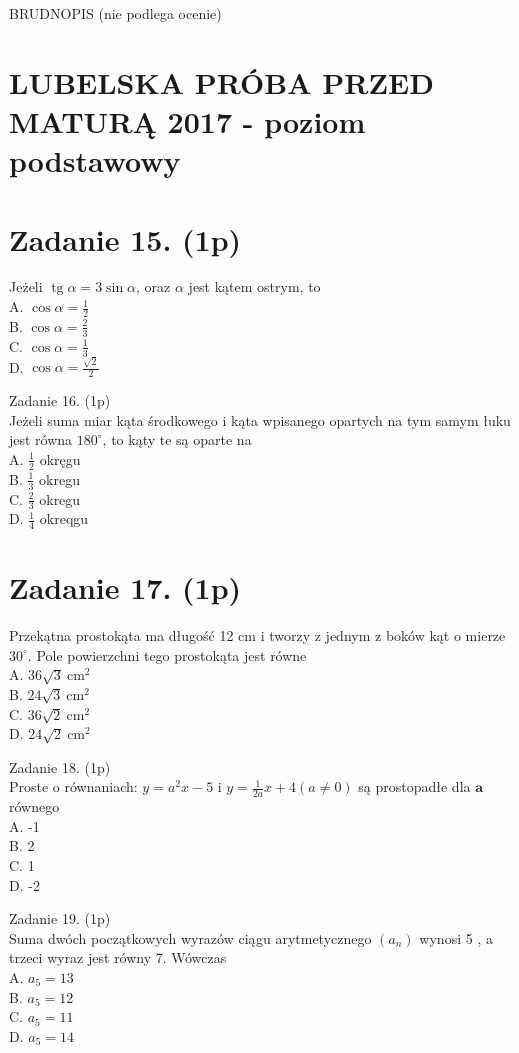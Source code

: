 \documentclass[10pt]{article}
\begin{document}
BRUDNOPIS (nie podlega ocenie)

\section*{LUBELSKA PRÓBA PRZED MATURĄ 2017 - poziom podstawowy}
\section*{Zadanie 15. (1p)}
Jeżeli \(\operatorname{tg} \alpha=3 \sin \alpha\), oraz \(\alpha\) jest kątem ostrym, to\\
A. \(\cos \alpha=\frac{1}{2}\)\\
B. \(\cos \alpha=\frac{2}{3}\)\\
C. \(\cos \alpha=\frac{1}{3}\)\\
D. \(\cos \alpha=\frac{\sqrt{2}}{2}\)

Zadanie 16. (1p)\\
Jeżeli suma miar kąta środkowego i kąta wpisanego opartych na tym samym łuku jest równa \(180^{\circ}\), to kąty te są oparte na\\
A. \(\frac{1}{2}\) okręgu\\
B. \(\frac{1}{3}\) okregu\\
C. \(\frac{2}{3}\) okregu\\
D. \(\frac{1}{4}\) okreqgu

\section*{Zadanie 17. (1p)}
Przekątna prostokąta ma długość 12 cm i tworzy z jednym z boków kąt o mierze \(30^{\circ}\). Pole powierzchni tego prostokąta jest równe\\
A. \(36 \sqrt{3} \mathrm{~cm}^{2}\)\\
B. \(24 \sqrt{3} \mathrm{~cm}^{2}\)\\
C. \(36 \sqrt{2} \mathrm{~cm}^{2}\)\\
D. \(24 \sqrt{2} \mathrm{~cm}^{2}\)

Zadanie 18. (1p)\\
Proste o równaniach: \(y=a^{2} x-5\) i \(y=\frac{1}{2 a} x+4(a \neq 0)\) są prostopadłe dla \(\boldsymbol{a}\) równego\\
A. -1\\
B. 2\\
C. 1\\
D. -2

Zadanie 19. (1p)\\
Suma dwóch początkowych wyrazów ciągu arytmetycznego \(\left(a_{n}\right)\) wynosi 5 , a trzeci wyraz jest równy 7. Wówczas\\
A. \(a_{5}=13\)\\
B. \(a_{5}=12\)\\
C. \(a_{5}=11\)\\
D. \(a_{5}=14\)
\end{document}
